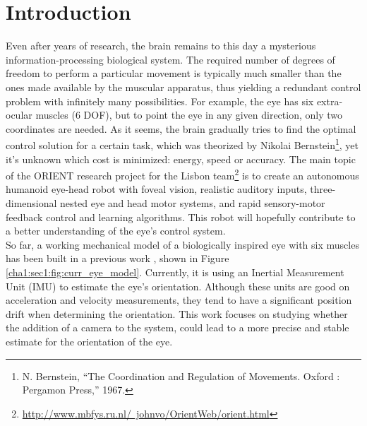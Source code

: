 
\section{Introduction}
\label{sec:intro}

Even after years of research, the brain remains to this day a mysterious information-processing biological system. The required number of degrees of freedom to perform a particular movement is typically much smaller than the ones made available by the muscular apparatus, thus yielding a redundant control problem with infinitely many possibilities. For example, the eye has six extra-ocular muscles (6 DOF), but to point the eye in any given direction, only two coordinates are needed. As it seems, the brain gradually tries to find the optimal control solution for a certain task, which was theorized by Nikolai Bernstein\footnote{N. Bernstein, “The Coordination and Regulation of Movements. Oxford : Pergamon Press,” 1967.}, yet it's unknown which cost is minimized: energy, speed or accuracy. The main topic of the ORIENT research project for the Lisbon team\footnote{\href{http://www.mbfys.ru.nl/~johnvo/OrientWeb/orient.html}{http://www.mbfys.ru.nl/~johnvo/OrientWeb/orient.html}} is to create an autonomous humanoid eye-head robot with foveal vision, realistic auditory inputs, three-dimensional nested eye and head motor systems, and rapid sensory-motor feedback control and learning algorithms. This robot will hopefully contribute to a better understanding of the eye's control system.\\

So far, a working mechanical model of a biologically inspired eye with six muscles has been built in a previous work \cite{tesemiguel}, shown in Figure \ref{cha1:sec1:fig:curr_eye_model}. Currently, it is using an Inertial Measurement Unit (IMU) to estimate the eye's orientation. Although these units are good on acceleration and velocity measurements, they tend to have a significant position drift when determining the orientation. This work focuses on studying whether the addition of a camera to the system, could lead to a more precise and stable estimate for the orientation of the eye.\\

